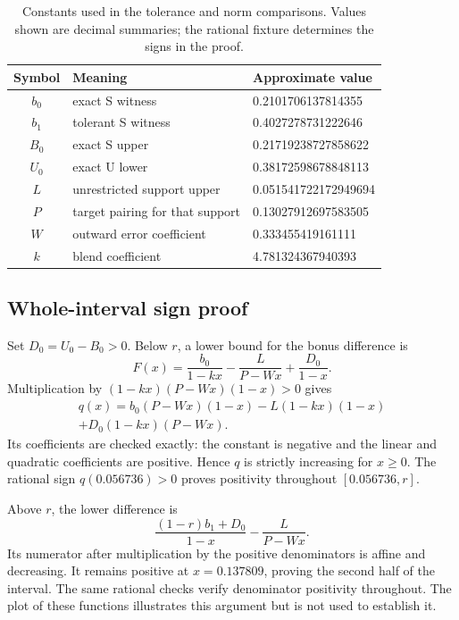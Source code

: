\documentclass[9pt]{osa-supplemental-document}
\begin{document}
\begin{table}[htbp]
\centering
\caption{Constants used in the tolerance and norm comparisons. Values shown are decimal summaries; the rational fixture determines the signs in the proof.}
\label{tab:constants}
\begin{tabular}{cll}
\toprule
Symbol & Meaning & Approximate value\\
\midrule
$b_0$ & exact S witness & 0.2101706137814355\\
$b_1$ & tolerant S witness & 0.4027278731222646\\
$B_0$ & exact S upper & 0.21719238727858622\\
$U_0$ & exact U lower & 0.38172598678848113\\
$L$ & unrestricted support upper & 0.051541722172949694\\
$P$ & target pairing for that support & 0.13027912697583505\\
$W$ & outward error coefficient & 0.333455419161111\\
$k$ & blend coefficient & 4.781324367940393\\
\bottomrule
\end{tabular}
\end{table}

\subsection{Whole-interval sign proof}
Set $D_0=U_0-B_0>0$. Below $r$, a lower bound for the bonus difference is
\begin{equation}
 F(x)=\frac{b_0}{1-kx}-\frac{L}{P-Wx}+\frac{D_0}{1-x}.
\end{equation}
Multiplication by $(1-kx)(P-Wx)(1-x)>0$ gives
\begin{multline}
 q(x)=b_0(P-Wx)(1-x)-L(1-kx)(1-x)\\
 +D_0(1-kx)(P-Wx).
\end{multline}
Its coefficients are checked exactly: the constant is negative and the linear and quadratic coefficients are positive. Hence $q$ is strictly increasing for $x\geq0$. The rational sign $q(0.056736)>0$ proves positivity throughout $[0.056736,r]$.

Above $r$, the lower difference is
\begin{equation}
 \frac{(1-r)b_1+D_0}{1-x}-\frac{L}{P-Wx}.
\end{equation}
Its numerator after multiplication by the positive denominators is affine and decreasing. It remains positive at $x=0.137809$, proving the second half of the interval. The same rational checks verify denominator positivity throughout. The plot of these functions illustrates this argument but is not used to establish it.
\end{document}
